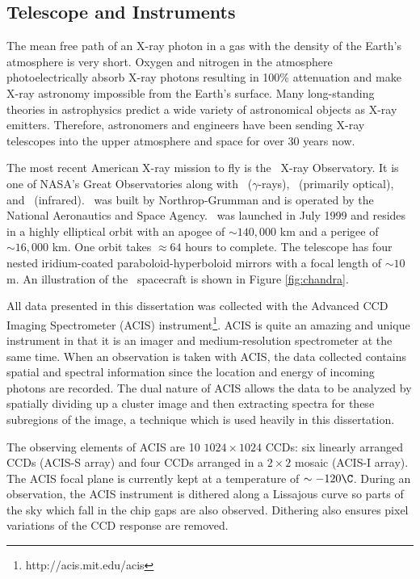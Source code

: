 \subsection{Telescope and Instruments}
\label{sec:tele}

The mean free path of an X-ray photon in a gas with the density of the
Earth's atmosphere is very short. Oxygen and nitrogen in the
atmosphere photoelectrically absorb X-ray photons resulting in 100\%
attenuation and make X-ray astronomy impossible from the Earth's
surface. Many long-standing theories in astrophysics predict a wide
variety of astronomical objects as X-ray emitters. Therefore,
astronomers and engineers have been sending X-ray telescopes into the
upper atmosphere and space for over 30 years now.

The most recent American X-ray mission to fly is the \chandra\ X-ray
Observatory. It is one of NASA's Great Observatories along with
\compton\ ($\gamma$-rays), \hubble\ (primarily optical), and
\spitzer\ (infrared). \chandra\ was built by Northrop-Grumman and is
operated by the National Aeronautics and Space Agency. \chandra\ was
launched in July 1999 and resides in a highly elliptical orbit with an
apogee of $\sim 140,000$ km and a perigee of $\sim 16,000$ km. One
orbit takes $\approx 64$ hours to complete. The telescope has four
nested iridium-coated paraboloid-hyperboloid mirrors with a focal
length of $\sim 10$ m. An illustration of the \chandra\ spacecraft is
shown in Figure \ref{fig:chandra}.

All data presented in this dissertation was collected with the
Advanced CCD Imaging Spectrometer (ACIS)
instrument\footnote{http://acis.mit.edu/acis}. ACIS is quite an
amazing and unique instrument in that it is an imager and
medium-resolution spectrometer at the same time. When an observation
is taken with ACIS, the data collected contains spatial and spectral
information since the location and energy of incoming photons are
recorded. The dual nature of ACIS allows the data to be analyzed by
spatially dividing up a cluster image and then extracting spectra for
these subregions of the image, a technique which is used heavily in
this dissertation.

The observing elements of ACIS are 10 $1024\times1024$ CCDs: six
linearly arranged CCDs (ACIS-S array) and four CCDs arranged in a
$2\times2$ mosaic (ACIS-I array). The ACIS focal plane is currently
kept at a temperature of $\sim -120\C$. During an observation, the
ACIS instrument is dithered along a Lissajous curve so parts of the
sky which fall in the chip gaps are also observed. Dithering also
ensures pixel variations of the CCD response are removed.

